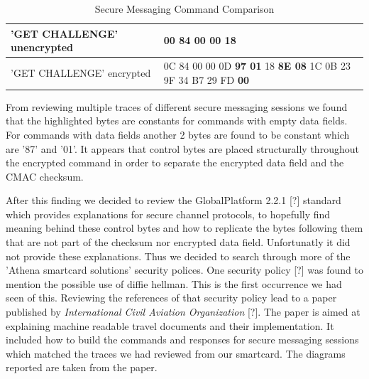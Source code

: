\documentclass[bsc,frontabs,twoside,singlespacing,parskip,deptreport]{infthesis}     %
\begin{document}
\begin{table}[H]
\hskip-1.5cm\begin{tabular}{|l|p{10cm}|}
\hline
'GET CHALLENGE' unencrypted & 00 84 00 00 18\\
\hline
'GET CHALLENGE' encrypted & 0C 84 00 00 0D \textbf{97 01} 18 \textbf{8E 08} 1C 0B 23 9F 34 B7 29 FD \textbf{00}\\
\hline
\end{tabular}
\caption{Secure Messaging Command Comparison}
\end{table}

From reviewing multiple traces of different secure messaging sessions we found that the highlighted bytes are constants for commands with empty data fields. For commands with data fields another 2 bytes are found to be constant which are '87' and  '01'. It appears that control bytes are placed structurally throughout the encrypted command in order to separate the encrypted data field and the CMAC checksum. 

After this finding we decided to review the GlobalPlatform 2.2.1 [?] standard which provides explanations for secure channel protocols, to hopefully find meaning behind these control bytes and how to replicate the bytes following them that are not part of the checksum nor encrypted data field. Unfortunatly it did not provide these explanations. Thus we decided to search through more of the 'Athena smartcard solutions' security polices. One security policy [?] was found to mention the possible use of diffie hellman. This is the first occurrence we had seen of this. Reviewing the references of that security policy lead to a paper published by \textit{International Civil Aviation Organization} [?]. The paper is aimed at explaining machine readable travel documents and their implementation. It included how to build the commands and responses for secure messaging sessions which matched the traces we had reviewed from our smartcard. The diagrams reported are taken from the paper.
\end{document}
